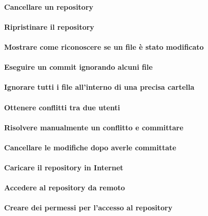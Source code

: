 \documentclass[a4paper]{article}
\begin{document}
	\paragraph{Cancellare un repository}
	
	\paragraph{Ripristinare il repository}
	
	\paragraph{Mostrare come riconoscere se un file è stato modificato}
	
	\paragraph{Eseguire un commit ignorando alcuni file}
	
	\paragraph{Ignorare tutti i file all'interno di una precisa cartella}
	
	\paragraph{Ottenere conflitti tra due utenti}
	
	\paragraph{Risolvere manualmente un conflitto e committare}
	
	\paragraph{Cancellare le modifiche dopo averle committate}
	
	\paragraph{Caricare il repository in Internet}
	
	\paragraph{Accedere al repository da remoto}
	
	\paragraph{Creare dei permessi per l'accesso al repository}
	
\end{document}
